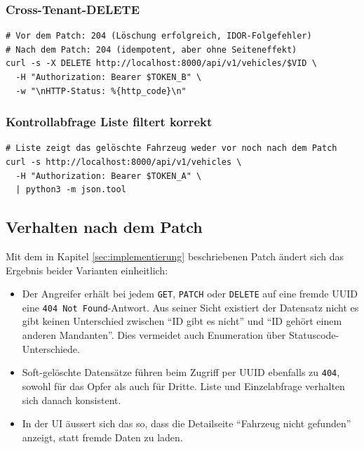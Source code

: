 \begin{appendix}
    \subsubsection*{Cross-Tenant-DELETE}

\begin{lstlisting}[style=custombash, caption={Der Angreifer versucht, das fremde Fahrzeug zu löschen.}]
# Vor dem Patch: 204 (Löschung erfolgreich, IDOR-Folgefehler)
# Nach dem Patch: 204 (idempotent, aber ohne Seiteneffekt)
curl -s -X DELETE http://localhost:8000/api/v1/vehicles/$VID \
  -H "Authorization: Bearer $TOKEN_B" \
  -w "\nHTTP-Status: %{http_code}\n"
\end{lstlisting}

    \subsubsection*{Kontrollabfrage \textendash{} Liste filtert korrekt}

\begin{lstlisting}[style=custombash, caption={Der Listenendpunkt war immer korrekt; der Bypass betrifft nur die Einzelabfrage per ID.}]
# Liste zeigt das gelöschte Fahrzeug weder vor noch nach dem Patch
curl -s http://localhost:8000/api/v1/vehicles \
  -H "Authorization: Bearer $TOKEN_A" \
  | python3 -m json.tool
\end{lstlisting}

    \subsection{Verhalten nach dem Patch}

    Mit dem in Kapitel \ref{sec:implementierung} beschriebenen Patch
    ändert sich das Ergebnis beider Varianten einheitlich:

    \begin{itemize}
        \item Der Angreifer erhält bei jedem \texttt{GET}, \texttt{PATCH}
              oder \texttt{DELETE} auf eine fremde UUID eine
              \texttt{404 Not Found}-Antwort. Aus seiner Sicht existiert
              der Datensatz nicht \textemdash{} es gibt keinen
              Unterschied zwischen \enquote{ID gibt es nicht} und
              \enquote{ID gehört einem anderen Mandanten}. Dies vermeidet
              auch Enumeration über Statuscode-Unterschiede.
        \item Soft-gelöschte Datensätze führen beim Zugriff per UUID
              ebenfalls zu \texttt{404}, sowohl für das Opfer als auch
              für Dritte. Liste und Einzelabfrage verhalten sich danach
              konsistent.
        \item In der UI äussert sich das so, dass die Detailseite
              \enquote{Fahrzeug nicht gefunden} anzeigt, statt fremde
              Daten zu laden.
    \end{itemize}


\end{appendix}
